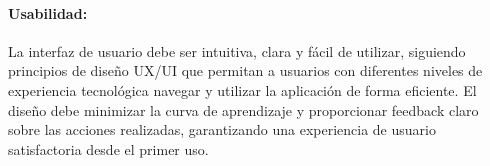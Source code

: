 \paragraph{Usabilidad:}
La interfaz de usuario debe ser intuitiva, clara y fácil de utilizar, siguiendo principios de diseño UX/UI que permitan a usuarios con diferentes niveles de experiencia tecnológica navegar y utilizar la aplicación de forma eficiente. El diseño debe minimizar la curva de aprendizaje y proporcionar feedback claro sobre las acciones realizadas, garantizando una experiencia de usuario satisfactoria desde el primer uso.